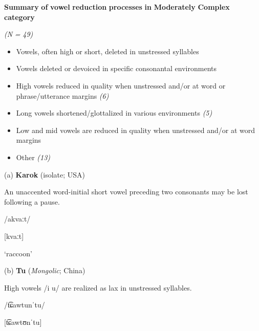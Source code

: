 \ea\label{ex:(6.17)}
  \textbf{Summary} \textbf{of} \textbf{vowel} \textbf{reduction} \textbf{processes} \textbf{in} \textbf{Moderately} \textbf{Complex} \textbf{category} 



\textit{(N} \textit{=} \textit{49)}


\begin{itemize}
\item 
Vowels, often high or short, deleted in unstressed syllables \textit{}

\item 
Vowels deleted or devoiced in specific consonantal environments \textit{}

\item 
High vowels reduced in quality when unstressed and/or at word or phrase/utterance margins \textit{(6)}

\item 
Long vowels shortened/glottalized in various environments \textit{(5)}

\item 
Low and mid vowels are reduced in quality when unstressed and/or at word margins \textit{}

\item 
Other \textit{(13)}

\end{itemize}

(a)   \textbf{Karok} (isolate; USA)



An unaccented word-initial short vowel preceding two consonants may be lost following a pause.



/akvaːt/



[kvaːt]



‘raccoon’



\citep[53]{Bright1957}



(b)  \textbf{Tu} (\textit{Mongolic}; China)



High vowels /i u/ are realized as lax in unstressed syllables. 



/t͡ɕawtunˈtu/



[t͡ɕawtʊnˈtu]



